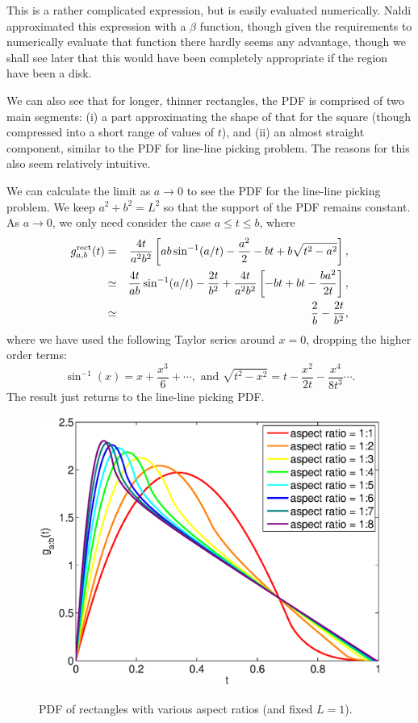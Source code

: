This is a rather complicated expression, but is easily evaluated
numerically.  Naldi \cite{m.naldi05:_connec_of_waxman_graph}
approximated this expression with a $\beta$ function, though given the
requirements to numerically evaluate that function there hardly seems
any advantage, though we shall see later that this would have been
completely appropriate if the region have been a disk.

We can also see that for longer, thinner rectangles, the PDF is
comprised of two main segments: (i) a part approximating the shape of
that for the square (though compressed into a short range of values of
$t$), and (ii) an almost straight component, similar to the PDF for
line-line picking problem. The reasons for this also seem relatively
intuitive. 

We can calculate the limit as $a \rightarrow 0$ to see the PDF for the
line-line picking problem.  We keep $a^2 + b^2 = L^2$ so that the
support of the PDF remains constant.  As $a \rightarrow 0$, we only
need consider the case $a \leq t \leq b$, where
\begin{eqnarray}
    g^{\rm rect}_{a,b}(t)
        & = & \frac{4 t}{a^2 b^2} 
                  \left[ a b \sin^{-1} (a/t) - \frac{a^2}{2} - b t + b\sqrt{t^2 - a^2} \right] , \nonumber \\
        & \simeq & \frac{4t }{a b} \sin^{-1} (a/t)
                   - \frac{2 t}{b^2}
                    + \frac{4 t}{a^2 b^2} \left[ -b t + b t - \frac{b a^2}{2 t} \right] , \nonumber \\
        & \simeq & \frac{2}{b}
                   - \frac{2 t}{b^2}, 
\end{eqnarray}
where we have used the following Taylor series around $x=0$, dropping
the higher order terms:
\[ \sin^{-1}(x) = x + \frac{x^3}{6} + \cdots, 
   \mbox{ and }
   \sqrt{t^2 - x^2} = t - \frac{x^2}{2t} - \frac{x^4}{8 t^3} \cdots .
\]
The result just returns to the line-line picking PDF.

\begin{figure}[htbp]
  \begin{center}
    \includegraphics[width=0.4\columnwidth]
          {../Matlab/Plots/LinePicking_plot_rect.eps}
    \label{fig:rect_pdf_var}
    \caption{PDF of rectangles with various aspect
              ratios (and fixed $L=1$).}
  \end{center} 
\vspace{-4mm}
\end{figure}

